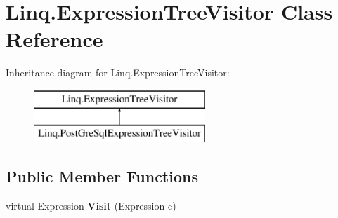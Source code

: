 \hypertarget{class_linq_1_1_expression_tree_visitor}{}\section{Linq.\+Expression\+Tree\+Visitor Class Reference}
\label{class_linq_1_1_expression_tree_visitor}
Inheritance diagram for Linq.\+Expression\+Tree\+Visitor\+:\begin{figure}[H]
\begin{center}
\leavevmode
\includegraphics[height=2.000000cm]{class_linq_1_1_expression_tree_visitor}
\end{center}
\end{figure}
\subsection*{Public Member Functions}
\begin{DoxyCompactItemize}
\item 
\mbox{\label{class_linq_1_1_expression_tree_visitor_a9a440f4c1429a26ffe410603fc0b3f34}} 
virtual Expression {\bfseries Visit} (Expression e)
\end{DoxyCompactItemize}
